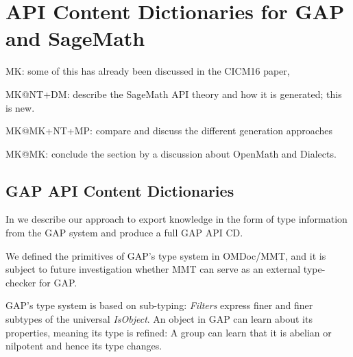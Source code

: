 \section{API Content Dictionaries for GAP and SageMath}\label{sec:apit}
\begin{todolist}{MK: some of this has already been discussed in the CICM16 paper, }
\item MK@NT+DM: describe the SageMath API theory and how it is generated; this is
  new. 
\item MK@MK+NT+MP: compare and discuss the different generation approaches
\item MK@MK: conclude the section by a discussion about OpenMath and Dialects.
\end{todolist}


\subsection{GAP API Content Dictionaries}

In \cite{DehKohKon:iop16} we describe our approach to export knowledge in the
form of type information from the GAP system and produce a full GAP API CD.

We defined the primitives of GAP's type system in OMDoc/MMT, and it is
subject to future investigation whether MMT can serve as an external type-checker
for GAP.

GAP's type system is based on sub-typing: \emph{Filters} express finer and finer
subtypes of the universal \emph{IsObject}. An object in GAP can learn about its
properties, meaning its type is refined: A group can learn that it is abelian or
nilpotent and hence its type changes.

